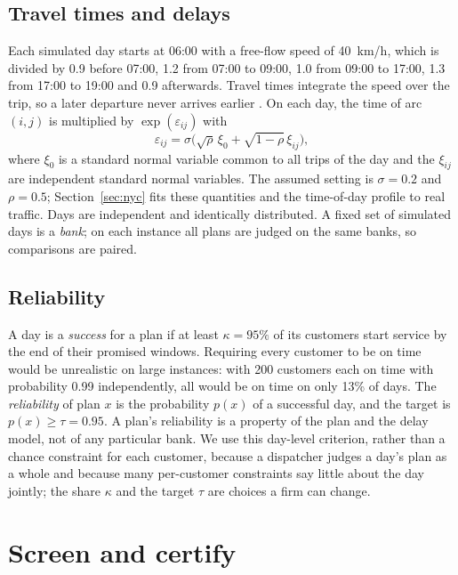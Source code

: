 \documentclass[11pt,a4paper]{article}
\theoremstyle{remark}
\begin{document}
\subsection{Travel times and delays}

Each simulated day starts at 06:00 with a free-flow speed of 40~km/h, which is
divided by 0.9 before 07:00, 1.2 from 07:00 to 09:00, 1.0 from 09:00 to 17:00, 1.3
from 17:00 to 19:00 and 0.9 afterwards. Travel times integrate the speed over the
trip, so a later departure never arrives earlier \citep{ichoua2003,ghiani2014}. On
each day, the time of arc $(i,j)$ is multiplied by $\exp(\varepsilon_{ij})$ with
\begin{equation}
 \varepsilon_{ij}=\sigma\bigl(\sqrt{\rho}\,\xi_0+\sqrt{1-\rho}\,\xi_{ij}\bigr),
 \label{eq:noise}
\end{equation}
where $\xi_0$ is a standard normal variable common to all trips of the day and the
$\xi_{ij}$ are independent standard normal variables. The assumed setting is
$\sigma=0.2$ and $\rho=0.5$; Section~\ref{sec:nyc} fits these quantities and the
time-of-day profile to real traffic. Days are independent and identically
distributed. A fixed set of simulated days is a \emph{bank}; on each instance all
plans are judged on the same banks, so comparisons are paired.

\subsection{Reliability}

A day is a \emph{success} for a plan if at least $\kappa=95\%$ of its customers
start service by the end of their promised windows. Requiring every customer to be
on time would be unrealistic on large instances: with 200 customers each on time
with probability 0.99 independently, all would be on time on only 13\% of days. The
\emph{reliability} of plan $x$ is the probability $p(x)$ of a successful day, and
the target is $p(x)\ge\tau=0.95$. A plan's reliability is a property of the plan
and the delay model, not of any particular bank. We use this day-level criterion,
rather than a chance constraint for each customer, because a dispatcher judges a
day's plan as a whole and because many per-customer constraints say little about the
day jointly; the share $\kappa$ and the target $\tau$ are choices a firm can change.

\section{Screen and certify}\label{sec:method}
\end{document}
